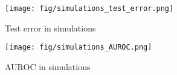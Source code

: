 





\begin{figure*}[htbp]
    \centering
    \texttt{[image: fig/simulations\_test\_error.png]}
    \caption{ Test error in simulations}
    \label{fig:simulations_test_error}
\end{figure*}

\begin{figure*}[htbp]
    \centering
    \texttt{[image: fig/simulations\_AUROC.png]}
    \caption{AUROC in simulations}
    \label{fig:simulations_AUROC}
\end{figure*}
